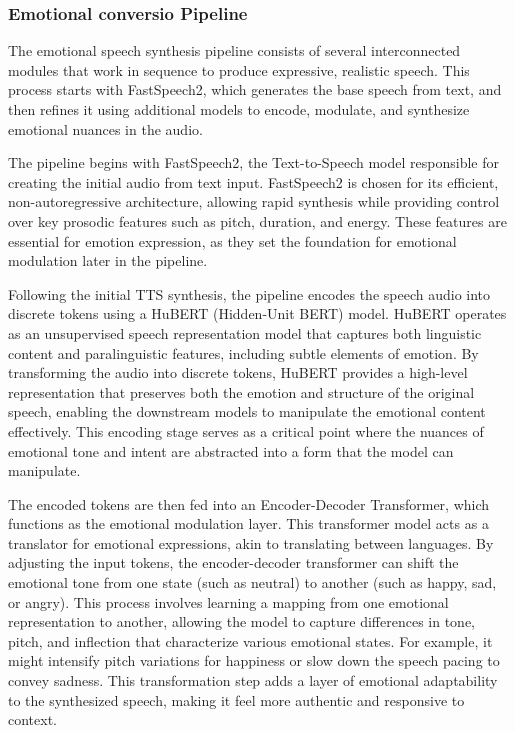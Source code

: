\subsubsection{Emotional conversio Pipeline}
The emotional speech synthesis pipeline consists of several interconnected modules that work in sequence to produce expressive, realistic speech. This process starts with FastSpeech2, which generates the base speech from text, and then refines it using additional models to encode, modulate, and synthesize emotional nuances in the audio.

The pipeline begins with FastSpeech2, the Text-to-Speech model responsible for creating the initial audio from text input. FastSpeech2 is chosen for its efficient, non-autoregressive architecture, allowing rapid synthesis while providing control over key prosodic features such as pitch, duration, and energy. These features are essential for emotion expression, as they set the foundation for emotional modulation later in the pipeline.

Following the initial TTS synthesis, the pipeline encodes the speech audio into discrete tokens using a HuBERT (Hidden-Unit BERT) model. HuBERT operates as an unsupervised speech representation model that captures both linguistic content and paralinguistic features, including subtle elements of emotion. By transforming the audio into discrete tokens, HuBERT provides a high-level representation that preserves both the emotion and structure of the original speech, enabling the downstream models to manipulate the emotional content effectively. This encoding stage serves as a critical point where the nuances of emotional tone and intent are abstracted into a form that the model can manipulate.

The encoded tokens are then fed into an Encoder-Decoder Transformer, which functions as the emotional modulation layer. This transformer model acts as a translator for emotional expressions, akin to translating between languages. By adjusting the input tokens, the encoder-decoder transformer can shift the emotional tone from one state (such as neutral) to another (such as happy, sad, or angry). This process involves learning a mapping from one emotional representation to another, allowing the model to capture differences in tone, pitch, and inflection that characterize various emotional states. For example, it might intensify pitch variations for happiness or slow down the speech pacing to convey sadness. This transformation step adds a layer of emotional adaptability to the synthesized speech, making it feel more authentic and responsive to context.

